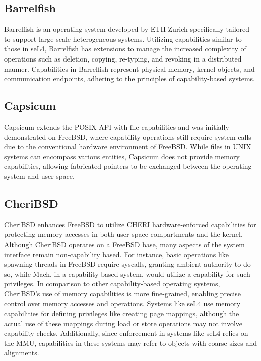 \subsection{Barrelfish}
Barrelfish\cite{baumann_multikernel_2009} is an operating system developed by ETH Zurich specifically tailored to support large-scale heterogeneous systems. Utilizing capabilities 
similar to those in seL4, Barrelfish has extensions to manage the increased complexity of operations such as deletion, copying, re-typing, 
and revoking in a distributed manner. Capabilities in Barrelfish represent physical memory, kernel objects, and communication 
endpoints, adhering to the principles of capability-based systems.
\newline

\subsection{Capsicum}
Capsicum\cite{watson_capsicum_nodate} extends the POSIX API with file capabilities and was initially demonstrated on FreeBSD, where capability operations still require 
system calls due to the conventional hardware environment of FreeBSD. While files in UNIX systems can encompass various entities, 
Capsicum does not provide memory capabilities, allowing fabricated pointers to be exchanged between the operating system and user space.
\newline

\subsection{CheriBSD}
CheriBSD\cite{noauthor_getting_nodate} enhances FreeBSD to utilize CHERI hardware-enforced capabilities for protecting memory accesses in both user space compartments 
and the kernel. Although CheriBSD operates on a FreeBSD base, many aspects of the system interface remain non-capability based. For instance, 
basic operations like spawning threads in FreeBSD require syscalls, granting ambient authority to do so, while Mach, in a capability-based system, 
would utilize a capability for such privileges. In comparison to other capability-based operating systems, CheriBSD's use of memory capabilities 
is more fine-grained, enabling precise control over memory accesses and operations. Systems like seL4 use memory capabilities for defining privileges 
like creating page mappings, although the actual use of these mappings during load or store operations may not involve capability checks. Additionally, 
since enforcement in systems like seL4 relies on the MMU, capabilities in these systems may refer to objects with coarse sizes and alignments.

